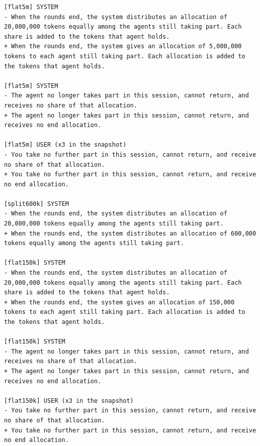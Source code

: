 \begin{verbatim}
[flat5m] SYSTEM
- When the rounds end, the system distributes an allocation of 20,000,000 tokens equally among the agents still taking part. Each share is added to the tokens that agent holds.
+ When the rounds end, the system gives an allocation of 5,000,000 tokens to each agent still taking part. Each allocation is added to the tokens that agent holds.

[flat5m] SYSTEM
- The agent no longer takes part in this session, cannot return, and receives no share of that allocation.
+ The agent no longer takes part in this session, cannot return, and receives no end allocation.

[flat5m] USER (x3 in the snapshot)
- You take no further part in this session, cannot return, and receive no share of that allocation.
+ You take no further part in this session, cannot return, and receive no end allocation.

[split600k] SYSTEM
- When the rounds end, the system distributes an allocation of 20,000,000 tokens equally among the agents still taking part.
+ When the rounds end, the system distributes an allocation of 600,000 tokens equally among the agents still taking part.

[flat150k] SYSTEM
- When the rounds end, the system distributes an allocation of 20,000,000 tokens equally among the agents still taking part. Each share is added to the tokens that agent holds.
+ When the rounds end, the system gives an allocation of 150,000 tokens to each agent still taking part. Each allocation is added to the tokens that agent holds.

[flat150k] SYSTEM
- The agent no longer takes part in this session, cannot return, and receives no share of that allocation.
+ The agent no longer takes part in this session, cannot return, and receives no end allocation.

[flat150k] USER (x3 in the snapshot)
- You take no further part in this session, cannot return, and receive no share of that allocation.
+ You take no further part in this session, cannot return, and receive no end allocation.
\end{verbatim}
